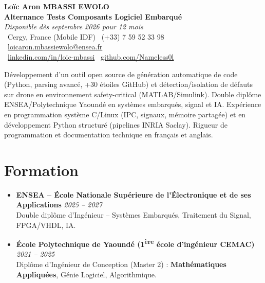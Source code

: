 \documentclass[a4paper,11pt]{article}
\begin{document}
\begin{center}
    {\Large \textbf{Loïc Aron MBASSI EWOLO}} \\ \vspace{4pt}
    \textbf{\large Alternance Tests Composants Logiciel Embarqué} \\
    \textit{\small Disponible dès septembre 2026 pour 12 mois} \\ \vspace{4pt}
    \small
    \faMapMarker\ Cergy, France (Mobile IDF) \quad
    \faPhone\ (+33) 7 59 52 33 98 \quad
    {\color{primary}\faEnvelope\ \href{mailto:loicaron.mbassiewolo@ensea.fr}{loicaron.mbassiewolo@ensea.fr}} \\ \vspace{2pt}
    {\color{primary}\faLinkedin\ \href{https://www.linkedin.com/in/loic-mbassi/}{linkedin.com/in/loic-mbassi}} \quad
    {\color{primary}\faGithub\ \href{https://github.com/Nameless0l}{github.com/Nameless0l}} \quad
\end{center}

\vspace{-6pt}

\noindent\small{Développement d'un outil open source de génération automatique de code (Python, parsing avancé, +30 étoiles GitHub) et détection/isolation de défauts sur drone en environnement safety-critical (MATLAB/Simulink). Double diplôme ENSEA/Polytechnique Yaoundé en systèmes embarqués, signal et IA. Expérience en programmation système C/Linux (IPC, signaux, mémoire partagée) et en développement Python structuré (pipelines INRIA Saclay). Rigueur de programmation et documentation technique en français et anglais.}

\section{Formation}
\begin{itemize}[leftmargin=*, label=\tiny$\bullet$, nosep]
    \item \textbf{ENSEA -- École Nationale Supérieure de l'Électronique et de ses Applications} \hfill \textit{2025 -- 2027} \\
    \small{Double diplôme d'Ingénieur -- Systèmes Embarqués, Traitement du Signal, FPGA/VHDL, IA.}
    \item \textbf{École Polytechnique de Yaoundé (1\textsuperscript{ère} école d'ingénieur CEMAC)} \hfill \textit{2021 -- 2025} \\
    \small{Diplôme d'Ingénieur de Conception (Master 2) : \textbf{Mathématiques Appliquées}, Génie Logiciel, Algorithmique.}
\end{itemize}
\end{document}

